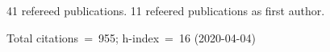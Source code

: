 41 refereed publications. 11 refeered publications as first author.

Total citations~=~955; h-index~=~16 (2020-04-04)
